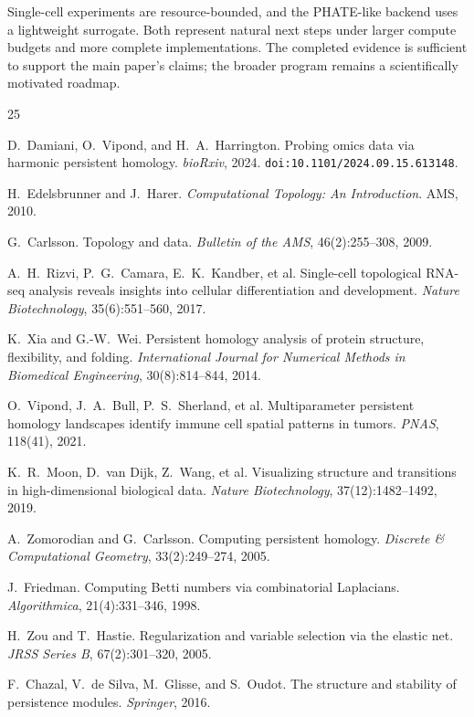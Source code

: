 \documentclass[11pt]{article}
\begin{document}
Single-cell experiments are resource-bounded, and the PHATE-like backend uses a lightweight surrogate.
Both represent natural next steps under larger compute budgets and more complete implementations.
The completed evidence is sufficient to support the main paper's claims; the broader program remains a scientifically motivated roadmap.


\begin{thebibliography}{25}

D.~Damiani, O.~Vipond, and H.~A.~Harrington.
Probing omics data via harmonic persistent homology.
\emph{bioRxiv}, 2024.
\texttt{doi:10.1101/2024.09.15.613148}.

H.~Edelsbrunner and J.~Harer.
\emph{Computational Topology: An Introduction}.
AMS, 2010.

G.~Carlsson.
Topology and data.
\emph{Bulletin of the AMS}, 46(2):255--308, 2009.

A.~H.~Rizvi, P.~G.~Camara, E.~K.~Kandber, et al.
Single-cell topological RNA-seq analysis reveals insights into cellular differentiation and development.
\emph{Nature Biotechnology}, 35(6):551--560, 2017.

K.~Xia and G.-W.~Wei.
Persistent homology analysis of protein structure, flexibility, and folding.
\emph{International Journal for Numerical Methods in Biomedical Engineering}, 30(8):814--844, 2014.

O.~Vipond, J.~A.~Bull, P.~S.~Sherland, et al.
Multiparameter persistent homology landscapes identify immune cell spatial patterns in tumors.
\emph{PNAS}, 118(41), 2021.

K.~R.~Moon, D.~van Dijk, Z.~Wang, et al.
Visualizing structure and transitions in high-dimensional biological data.
\emph{Nature Biotechnology}, 37(12):1482--1492, 2019.

A.~Zomorodian and G.~Carlsson.
Computing persistent homology.
\emph{Discrete \& Computational Geometry}, 33(2):249--274, 2005.

J.~Friedman.
Computing Betti numbers via combinatorial Laplacians.
\emph{Algorithmica}, 21(4):331--346, 1998.

H.~Zou and T.~Hastie.
Regularization and variable selection via the elastic net.
\emph{JRSS Series B}, 67(2):301--320, 2005.

F.~Chazal, V.~de Silva, M.~Glisse, and S.~Oudot.
The structure and stability of persistence modules.
\emph{Springer}, 2016.


\end{thebibliography}
\end{document}
